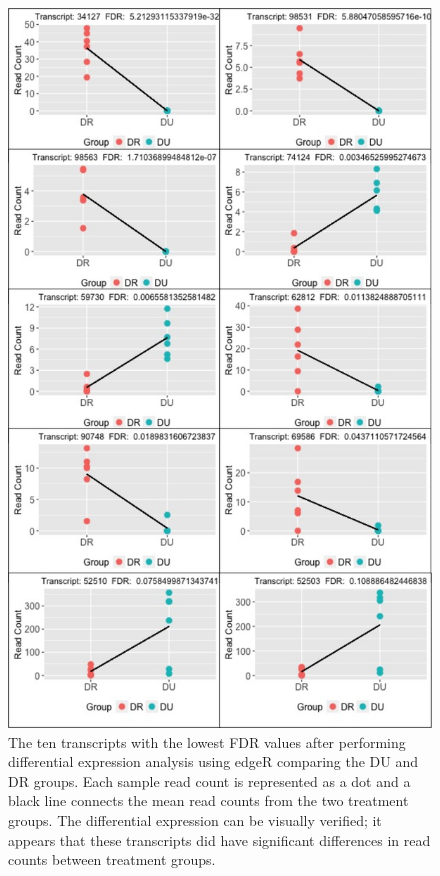 \documentclass[11pt,a4paper,oldfontcommands,openany]{memoir}
\numberwithin{equation}{section} %
\begin{document}
\begin{figure}[H]
    \begin{framed}
    \centering
    \includegraphics[width=\textwidth]{degPW}
    \end{framed}
    \caption{The ten transcripts with the lowest FDR values after performing differential expression analysis using edgeR comparing the DU and DR groups. Each sample read count is represented as a dot and a black line connects the mean read counts from the two treatment groups. The differential expression can be visually verified; it appears that these transcripts did have significant differences in read counts between treatment groups.}
    \label{fig:degPW}
\end{figure}
\end{document}
